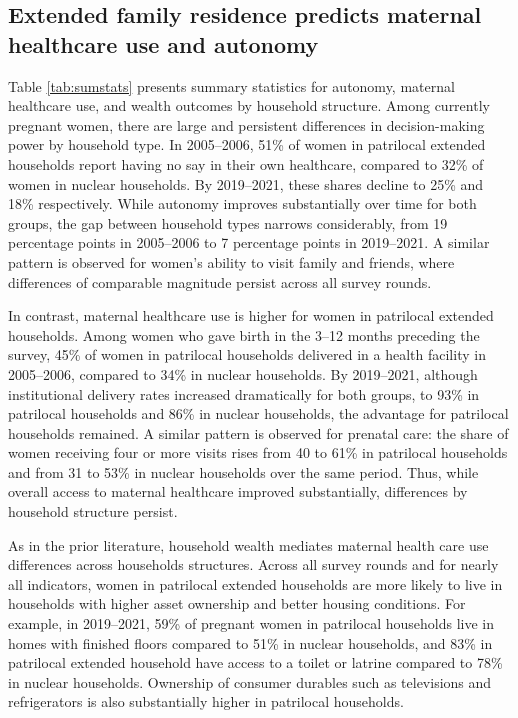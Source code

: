 \documentclass[10pt,twoside,reqno]{article}
\begin{document}
\subsection*{Extended family residence predicts maternal healthcare use and autonomy}

Table \ref{tab:sumstats} presents summary statistics for autonomy, maternal healthcare use, and wealth outcomes by household structure. Among currently pregnant women, there are large and persistent differences in decision-making power by household type. In 2005–2006, 51\% of women in patrilocal extended households report having no say in their own healthcare, compared to 32\% of women in nuclear households. By 2019–2021, these shares decline to 25\% and 18\% respectively. While autonomy improves substantially over time for both groups, the gap between household types narrows considerably, from 19 percentage points in 2005–2006 to 7 percentage points in 2019–2021. A similar pattern is observed for women’s ability to visit family and friends, where differences of comparable magnitude persist across all survey rounds.

In contrast, maternal healthcare use is higher for women in patrilocal extended households. Among women who gave birth in the 3–12 months preceding the survey, 45\% of women in patrilocal households delivered in a health facility in 2005–2006, compared to 34\% in nuclear households. By 2019–2021, although institutional delivery rates increased dramatically for both groups, to 93\% in patrilocal households and 86\% in nuclear households, the advantage for patrilocal households remained. A similar pattern is observed for prenatal care: the share of women receiving four or more visits rises from 40 to 61\% in patrilocal households and from 31 to 53\% in nuclear households over the same period. Thus, while overall access to maternal healthcare improved substantially, differences by household structure persist.

As in the prior literature, household wealth mediates maternal health care use differences across households structures. Across all survey rounds and for nearly all indicators, women in patrilocal extended households are more likely to live in households with higher asset ownership and better housing conditions. For example, in 2019–2021, 59\% of pregnant women in patrilocal households live in homes with finished floors compared to 51\% in nuclear households, and 83\% in patrilocal extended household have access to a toilet or latrine compared to 78\% in nuclear households. Ownership of consumer durables such as televisions and refrigerators is also substantially higher in patrilocal households.
\end{document}
